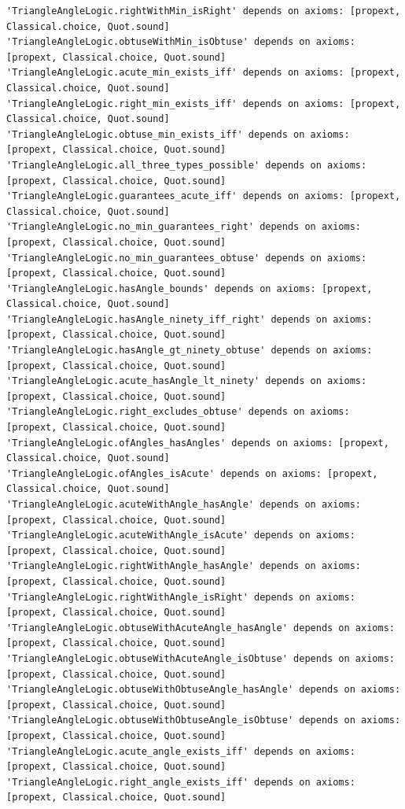 \documentclass[UTF8,a4paper,zihao=-4,oneside,openany,fontset=fandol]{ctexbook}
\theoremstyle{definition}
\theoremstyle{remark}
\begin{document}
\begin{Verbatim}[fontsize=\fontsize{8.5}{11}\selectfont]
'TriangleAngleLogic.rightWithMin_isRight' depends on axioms: [propext, Classical.choice, Quot.sound]
'TriangleAngleLogic.obtuseWithMin_isObtuse' depends on axioms: [propext, Classical.choice, Quot.sound]
'TriangleAngleLogic.acute_min_exists_iff' depends on axioms: [propext, Classical.choice, Quot.sound]
'TriangleAngleLogic.right_min_exists_iff' depends on axioms: [propext, Classical.choice, Quot.sound]
'TriangleAngleLogic.obtuse_min_exists_iff' depends on axioms: [propext, Classical.choice, Quot.sound]
'TriangleAngleLogic.all_three_types_possible' depends on axioms: [propext, Classical.choice, Quot.sound]
'TriangleAngleLogic.guarantees_acute_iff' depends on axioms: [propext, Classical.choice, Quot.sound]
'TriangleAngleLogic.no_min_guarantees_right' depends on axioms: [propext, Classical.choice, Quot.sound]
'TriangleAngleLogic.no_min_guarantees_obtuse' depends on axioms: [propext, Classical.choice, Quot.sound]
'TriangleAngleLogic.hasAngle_bounds' depends on axioms: [propext, Classical.choice, Quot.sound]
'TriangleAngleLogic.hasAngle_ninety_iff_right' depends on axioms: [propext, Classical.choice, Quot.sound]
'TriangleAngleLogic.hasAngle_gt_ninety_obtuse' depends on axioms: [propext, Classical.choice, Quot.sound]
'TriangleAngleLogic.acute_hasAngle_lt_ninety' depends on axioms: [propext, Classical.choice, Quot.sound]
'TriangleAngleLogic.right_excludes_obtuse' depends on axioms: [propext, Classical.choice, Quot.sound]
'TriangleAngleLogic.ofAngles_hasAngles' depends on axioms: [propext, Classical.choice, Quot.sound]
'TriangleAngleLogic.ofAngles_isAcute' depends on axioms: [propext, Classical.choice, Quot.sound]
'TriangleAngleLogic.acuteWithAngle_hasAngle' depends on axioms: [propext, Classical.choice, Quot.sound]
'TriangleAngleLogic.acuteWithAngle_isAcute' depends on axioms: [propext, Classical.choice, Quot.sound]
'TriangleAngleLogic.rightWithAngle_hasAngle' depends on axioms: [propext, Classical.choice, Quot.sound]
'TriangleAngleLogic.rightWithAngle_isRight' depends on axioms: [propext, Classical.choice, Quot.sound]
'TriangleAngleLogic.obtuseWithAcuteAngle_hasAngle' depends on axioms: [propext, Classical.choice, Quot.sound]
'TriangleAngleLogic.obtuseWithAcuteAngle_isObtuse' depends on axioms: [propext, Classical.choice, Quot.sound]
'TriangleAngleLogic.obtuseWithObtuseAngle_hasAngle' depends on axioms: [propext, Classical.choice, Quot.sound]
'TriangleAngleLogic.obtuseWithObtuseAngle_isObtuse' depends on axioms: [propext, Classical.choice, Quot.sound]
'TriangleAngleLogic.acute_angle_exists_iff' depends on axioms: [propext, Classical.choice, Quot.sound]
'TriangleAngleLogic.right_angle_exists_iff' depends on axioms: [propext, Classical.choice, Quot.sound]

\end{Verbatim}
\end{document}
